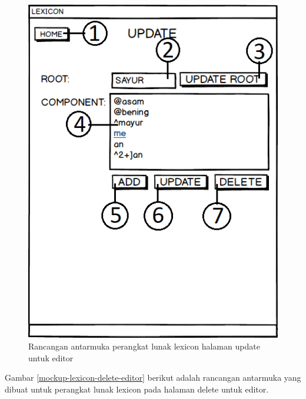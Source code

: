\begin{figure}[H]
\centering
\includegraphics[scale=0.8]{Gambar/mockup-lexicon-update-editor}
\caption{Rancangan antarmuka perangkat lunak lexicon halaman update untuk editor} 
\label{mockup-lexicon-update-editor}
\end{figure}

Gambar \ref{mockup-lexicon-delete-editor} berikut adalah rancangan antarmuka yang dibuat untuk perangkat lunak lexicon pada halaman delete untuk editor.

